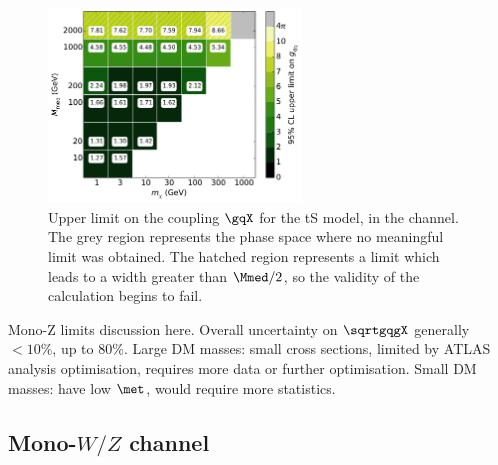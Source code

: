 \begin{figure}[h]
  \centering
    \includegraphics[width=0.6\textwidth]{figures/grid_allpoints_TSD_rat1.pdf}
    \caption{Upper limit on the coupling $\gqX$ for the tS model, in the \monoZ channel. The grey region represents the phase space where no meaningful limit was obtained. The hatched region represents a limit which leads to a width greater than $\Mmed / 2$, so the validity of the calculation begins to fail.}
    \label{fig:MonoZ_TSD_couplinglimit}
\end{figure}

Mono-Z limits discussion here. Overall uncertainty on $\sqrtgqgX$ generally $ < 10\%$, up to 80$\%$. Large DM masses: small cross sections, limited by ATLAS analysis optimisation, requires more data or further optimisation. Small DM masses: have low $\met$, would require more statistics.

\subsection{Mono-$W/Z$ channel}

